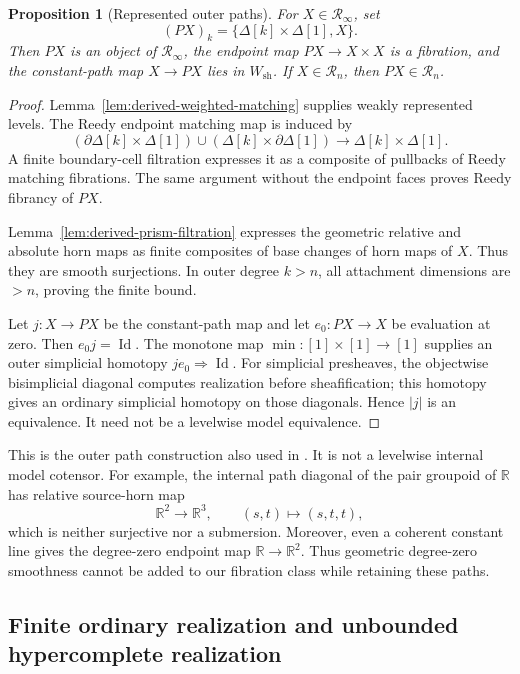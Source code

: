 \documentclass[12pt]{amsart}
\newtheorem{prop}[thm]{Proposition}
\theoremstyle{definition}
\theoremstyle{remark}
\numberwithin{equation}{section}
\newcommand{\R}{\mathbb R}
\DeclareMathOperator{\id}{Id}
\begin{document}
\begin{prop}[Represented outer paths]\label{prop:derived-outer-path}
For $X\in\mathscr R_\infty$, set
\[
 (PX)_k=\{\Delta[k]\times\Delta[1],X\}.
\]
Then $PX$ is an object of $\mathscr R_\infty$,
the endpoint map $PX\to X\times X$ is a fibration,
and the constant-path map $X\to PX$ lies in
$W_{\mathrm{sh}}$. If $X\in\mathscr R_n$, then
$PX\in\mathscr R_n$.
\end{prop}

\begin{proof}
Lemma~\ref{lem:derived-weighted-matching} supplies
weakly represented levels.
The Reedy endpoint matching map is induced by
\[
 (\partial\Delta[k]\times\Delta[1])
 \cup(\Delta[k]\times\partial\Delta[1])
 \longrightarrow\Delta[k]\times\Delta[1].
\]
A finite boundary-cell filtration expresses it as
a composite of pullbacks of Reedy matching fibrations.
The same argument without the endpoint faces proves
Reedy fibrancy of $PX$.

Lemma~\ref{lem:derived-prism-filtration} expresses the
geometric relative and absolute horn maps as finite
composites of base changes of horn maps of $X$.
Thus they are smooth surjections. In outer degree
$k>n$, all attachment dimensions are $>n$, proving
the finite bound.

Let $j:X\to PX$ be the constant-path map and let $e_0:PX\to X$
be evaluation at zero. Then $e_0j=\id$. The monotone
map $\min:[1]\times[1]\to[1]$ supplies an outer
simplicial homotopy $je_0\Rightarrow\id$.
For simplicial presheaves, the objectwise bisimplicial
diagonal computes realization before sheafification;
this homotopy gives an ordinary simplicial homotopy
on those diagonals. Hence $|j|$ is an equivalence.
It need not be a levelwise model equivalence.
\end{proof}

This is the outer path construction also used in
\cite[Definition~1.20 and Remark~3.28]{Pridham2013}.
It is not a levelwise internal model cotensor.
For example, the internal path diagonal of the pair
groupoid of $\R$ has relative source-horn map
\[
 \R^2\longrightarrow\R^3,\qquad(s,t)\longmapsto(s,t,t),
\]
which is neither surjective nor a submersion.
Moreover, even a coherent constant line gives the
degree-zero endpoint map $\R\to\R^2$.
Thus geometric degree-zero smoothness cannot be added
to our fibration class while retaining these paths.

\subsection{Finite ordinary realization and unbounded hypercomplete realization}
\end{document}
